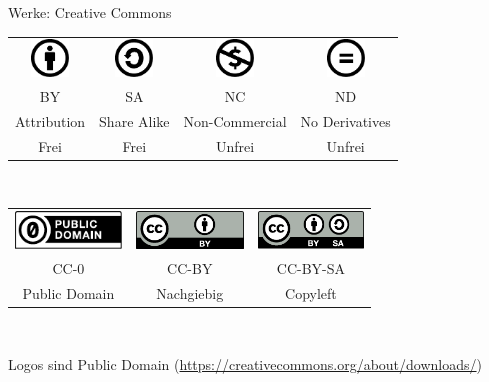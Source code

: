 \begin{frame}{Werke: Creative Commons}
	\begin{center}
	\begin{tabular}{cccc}
		\includegraphics[height=1cm]{res/by.pdf}
		&
		\includegraphics[height=1cm]{res/sa.pdf}
		&
		\includegraphics[height=1cm]{res/nc.pdf}
		&
		\includegraphics[height=1cm]{res/nd.pdf}
	\\
		BY
		&
		SA
		&
		NC
		&
		ND
	\\
		Attribution
		&
		Share Alike
		&
		Non-Commercial
		&
		No Derivatives
	\\
		Frei
		&
		Frei
		&
		Unfrei
		&
		Unfrei
	\end{tabular} 
	\\
	\vspace{1cm}
	\begin{tabular}{ccc}
		\includegraphics[height=1cm]{res/cc-zero.pdf}
		&
		\includegraphics[height=1cm]{res/cc-by.pdf}
		&
		\includegraphics[height=1cm]{res/cc-by-sa.pdf}
	\\
		CC-0
		&
		CC-BY
		&
		CC-BY-SA
	\\
		Public Domain
		&
		Nachgiebig
		&
		Copyleft
	\end{tabular} 
	\\
	\vspace{1cm}
	\end{center}
\end{frame}
\note
{
	Logos sind Public Domain (\url{https://creativecommons.org/about/downloads/})
}

